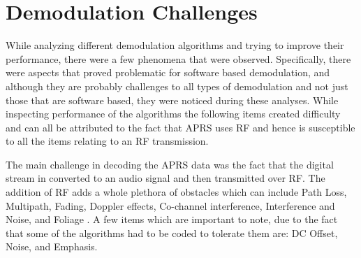 \chapter{Demodulation Challenges}
While analyzing different demodulation algorithms and trying to improve their performance, there were a few phenomena that were observed. Specifically, there were aspects that proved problematic for software based demodulation, and although they are probably challenges to all types of demodulation and not just those that are software based, they were noticed during these analyses. While inspecting performance of the algorithms the following items created difficulty and can all be attributed to the fact that APRS uses RF and hence is susceptible to all the items relating to an RF transmission. 

The main challenge in decoding the APRS data was the fact that the digital stream in converted to an audio signal and then transmitted over RF. The addition of RF adds a whole plethora of obstacles which can include Path Loss, Multipath, Fading, Doppler effects, Co-channel interference, Interference and Noise, and Foliage \cite{Goleniewski2006}. A few items which are important to note, due to the fact that some of the algorithms had to be coded to tolerate them are: DC Offset, Noise, and Emphasis.

